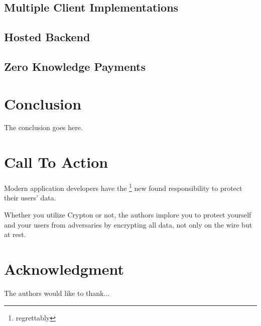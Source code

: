 \documentclass[conference]{IEEEtran}
\begin{document}
\subsection{Multiple Client Implementations}
\subsection{Hosted Backend}
\subsection{Zero Knowledge Payments}

\section{Conclusion}
The conclusion goes here.

\section{Call To Action}
Modern application developers have the \footnote{regrettably} new found responsibility
to protect their users' data.

Whether you utilize Crypton or not, the authors implore you to protect yourself
and your users from adversaries by encrypting all data, not only on the wire but at rest.

\section*{Acknowledgment}
The authors would like to thank...
\end{document}
